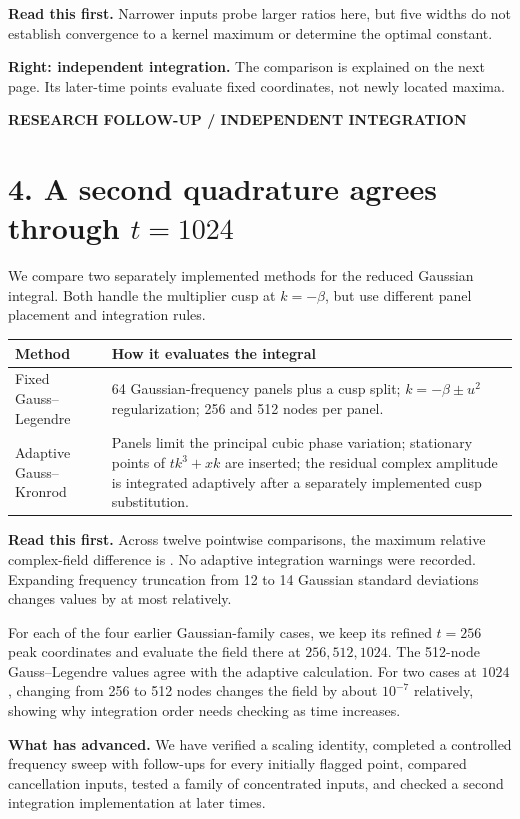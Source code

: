 \documentclass[10pt,letterpaper]{article}
\newcommand{\eyebrow}[1]{{\color{teal}\normalsize\bfseries #1}\par}
\newcommand{\takeaway}[1]{\par\smallskip\colorbox{pale}{\parbox{.96\linewidth}{\vspace{5pt}\textbf{Read this first.} #1\vspace{5pt}}}\par\smallskip}
\begin{document}
\takeaway{Narrower inputs probe larger ratios here, but five widths do not
establish convergence to a kernel maximum or determine the optimal constant.}
\textbf{Right: independent integration.} The comparison is explained on the next
page. Its later-time points evaluate fixed coordinates, not newly located maxima.

\newpage
{}\label{research4}

\eyebrow{RESEARCH FOLLOW-UP / INDEPENDENT INTEGRATION}
\section*{4. A second quadrature agrees through $t=1024$}
We compare two separately implemented methods for the reduced Gaussian integral.
Both handle the multiplier cusp at $k=-\beta$, but use different panel placement
and integration rules.
\begin{center}\begin{tabular}{p{.26\linewidth}p{.65\linewidth}}\toprule
Method & How it evaluates the integral\\\midrule
Fixed Gauss--Legendre & 64 Gaussian-frequency panels plus a cusp split;
$k=-\beta\pm u^2$ regularization; 256 and 512 nodes per panel.\\
Adaptive Gauss--Kronrod & Panels limit the principal cubic phase variation;
stationary points of $tk^3+xk$ are inserted; the residual complex amplitude is
integrated adaptively after a separately implemented cusp substitution.\\\bottomrule
\end{tabular}\end{center}
\takeaway{Across twelve pointwise comparisons, the maximum relative complex-field
difference is \texttt{\ResearchQuadError}. No adaptive integration warnings were
recorded. Expanding frequency truncation from 12 to 14 Gaussian standard deviations
changes values by at most \texttt{\ResearchQuadTail} relatively.}
For each of the four earlier Gaussian-family cases, we keep its refined $t=256$
peak coordinates and evaluate the field there at $256,512,1024$. The 512-node
Gauss--Legendre values agree with the adaptive calculation. For two cases at
$1024$, changing from 256 to 512 nodes changes the field by about $10^{-7}$
relatively, showing why integration order needs checking as time increases.

\textbf{What has advanced.} We have verified a scaling identity, completed a
controlled frequency sweep with follow-ups for every initially flagged point,
compared cancellation inputs, tested a family of concentrated inputs, and checked
a second integration implementation at later times.
\end{document}
